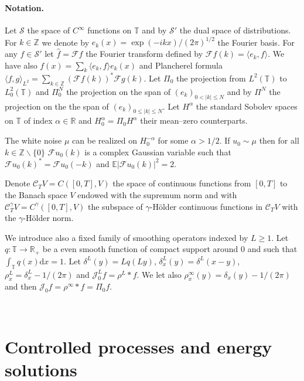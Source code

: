\documentclass[a4paper,11pt]{article}
\newcommand{\mathd}{\mathrm{d}}
\newcommand{\cS}{\mathscr{S}}
\newcommand{\cC}{\mathscr{C}}
\newcommand{\FF}{\mathscr{F}}
\newcommand{\JJ}{\mathcal{J}}
\begin{document}
\

\paragraph{Notation.}Let $\cS$ the space of $C^{\infty}$ functions on
$\mathbb{T}$ and by $\cS'$ the dual space of distributions. For $k \in
\mathbb{Z}$ we denote by $e_k (x) = \exp (- i k x) / (2 \pi)^{1 / 2}$ the
Fourier basis. For any $f \in \cS'$ let $\hat{f} = \FF f$ the Fourier
transform defined by $\FF f (k) = \langle e_k, f \rangle$. We have also $f (x)
= \sum_k \langle e_k, f \rangle e_k (x)$ and Plancherel formula $\langle f, g
\rangle_{L^2} = \sum_{k \in \mathbb{Z}} (\FF f (k))^{\ast} \FF g (k)$. Let
$\Pi_0$ the projection from $L^2 (\mathbb{T})$ to $L^2_0 (\mathbb{T})$ and
$\Pi^N_0$ the projection on the span of $(e_k)_{0 < | k | \leqslant N}$ and by
$\Pi^N$ the projection on the the span of $(e_k)_{0 \leqslant | k | \leqslant
N}$. Let $H^{\alpha}$ the standard Sobolev spaces on $\mathbb{T}$ of index
$\alpha \in \mathbb{R}$ and $H^{\alpha}_0 = \Pi_0 H^{\alpha}$ their
mean--zero counterparts.

The white noise $\mu$ can be realized on $H^{- \alpha}_0$ for some $\alpha > 1
/ 2$. If $u_0 \sim \mu$ then for all $k \in \mathbb{Z}\backslash \{ 0 \}$
$\FF u_0 (k)$ is a complex Gaussian variable such that $\FF u_0 (k)^{\ast} =
\FF u_0 (- k)$ and $\mathbb{E} \left| \FF u_0 (k) \right|^2 = 2$.

Denote $\cC_T V = C ([0, T], V)$ the space of continuous functions from $[0,
T]$ to the Banach space $V$ endowed with the supremum norm and with
$\cC^{\gamma}_T V = C^{\gamma} ([0, T], V)$ the subspace of
$\gamma$-H{\"o}lder continuous functions in $\cC_T V$ with the
$\gamma$-H{\"o}lder norm.

We introduce also a fixed family of smoothing operators indexed by $L
\geqslant 1$. Let $q : \mathbb{T} \rightarrow \mathbb{R}_+$ be a even smooth
function of compact support around $0$ and such that $\int_{\mathbb{T}} q (x)
\mathd x = 1$. Let $\delta^L (y) = Lq (L y)$, $\delta^L_x (y) = \delta^L (x -
y)$, $\rho^L_x = \delta^L_x - 1 / (2 \pi)$ and $\JJ^L_0 f = \rho^L_{} \ast f$.
We let also $\rho^{\infty}_x (y) = \delta_x (y) - 1 / (2 \pi)$ and then $\JJ_0
f = \rho^{\infty} \ast f = \Pi_0 f$.

\

\section{Controlled processes and energy solutions}
\end{document}
